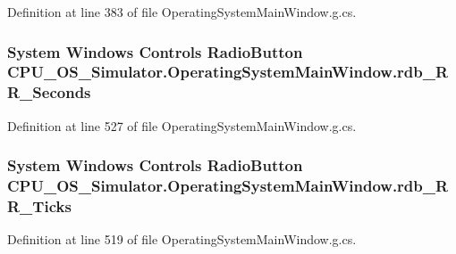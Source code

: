 Definition at line 383 of file Operating\+System\+Main\+Window.\+g.\+cs.

\hypertarget{class_c_p_u___o_s___simulator_1_1_operating_system_main_window_a97c4b8fbd9b9e86a44dc50b6dafd96f4}{}
\subsubsection[{rdb\+\_\+\+R\+R\+\_\+\+Seconds}]{\setlength{\rightskip}{0pt plus 5cm}System Windows Controls Radio\+Button C\+P\+U\+\_\+\+O\+S\+\_\+\+Simulator.\+Operating\+System\+Main\+Window.\+rdb\+\_\+\+R\+R\+\_\+\+Seconds\hspace{0.3cm}{\ttfamily [package]}}\label{class_c_p_u___o_s___simulator_1_1_operating_system_main_window_a97c4b8fbd9b9e86a44dc50b6dafd96f4}


Definition at line 527 of file Operating\+System\+Main\+Window.\+g.\+cs.

\hypertarget{class_c_p_u___o_s___simulator_1_1_operating_system_main_window_ac47f5adda2930d87ec387e030d2e8870}{}
\subsubsection[{rdb\+\_\+\+R\+R\+\_\+\+Ticks}]{\setlength{\rightskip}{0pt plus 5cm}System Windows Controls Radio\+Button C\+P\+U\+\_\+\+O\+S\+\_\+\+Simulator.\+Operating\+System\+Main\+Window.\+rdb\+\_\+\+R\+R\+\_\+\+Ticks\hspace{0.3cm}{\ttfamily [package]}}\label{class_c_p_u___o_s___simulator_1_1_operating_system_main_window_ac47f5adda2930d87ec387e030d2e8870}


Definition at line 519 of file Operating\+System\+Main\+Window.\+g.\+cs.

